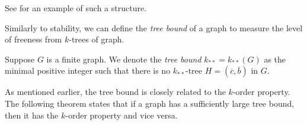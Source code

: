         See  for an example of such a structure.

        

        Similarly to stability, we can define the \emph{tree bound} of a graph to measure the level of freeness from $k$-trees
        of graph.

        \begin{definition}[Definition 2.11] \label{def:tree_bound}
            Suppose $G$ is a finite graph.
            We denote the \emph{tree bound} $k_{**} = k_{**}(G)$ as the minimal positive integer such that there is no
            $k_{**}$-tree $H = (\overline{c},\overline{b})$ in $G$.
        \end{definition}

        As mentioned earlier, the tree bound is closely related to the $k$-order property.
        The following theorem states that if a graph has a sufficiently large tree bound, then it has the $k$-order property
        and vice versa.

